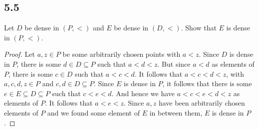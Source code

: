 \subsection*{5.5} Let $D$ be dense in $(P,<)$ and $E$ be dense in $(D, <)$. Show that $E$ is dense in $(P, <)$.

\begin{proof}
Let $a,z \in P$ be some arbitrarily chosen points with $a < z$. Since $D$ is dense in $P$, there is some $d \in D \subseteq P$ such that $a < d < z$. But since $a < d$ as elements of $P$, there is some $c \in D$ such that $a < c < d$. It follows that $a < c < d < z$, with $a,c,d,z \in P$ and $c,d \in D \subseteq P$. Since $E$ is dense in $P$, it follows that there is some $e \in E \subseteq D \subseteq P$ such that $c < e < d$. And hence we have $a < c < e < d < z$ as elements of $P$. It follows that $a < e < z$. Since $a,z$ have been arbitrarily chosen elements of $P$ and we found some element of $E$ in between them, $E$ is dense in $P$.




\end{proof}


